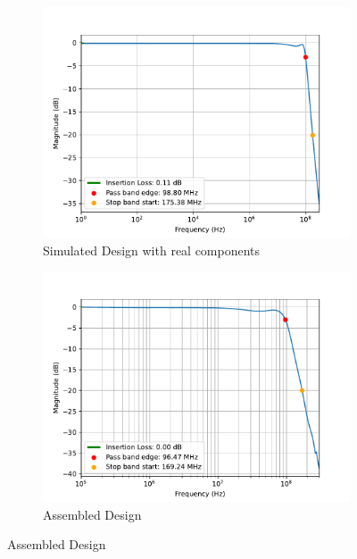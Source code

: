 \documentclass[letterpaper,12pt]{article}
\begin{document}
\begin{figure}[H]
    \medskip
  
    \begin{subfigure}[t]{.49\textwidth}
      \centering
      \includegraphics[width=\linewidth]{figures/6.real}
      \caption{Simulated Design with real components}
    \end{subfigure}
    \hfill
    \begin{subfigure}[t]{.49\textwidth}
      \centering
      \includegraphics[width=\linewidth]{figures/6.assembled}
      \caption{Assembled Design}
    \end{subfigure}
  \end{figure}

\newpage
\end{document}

